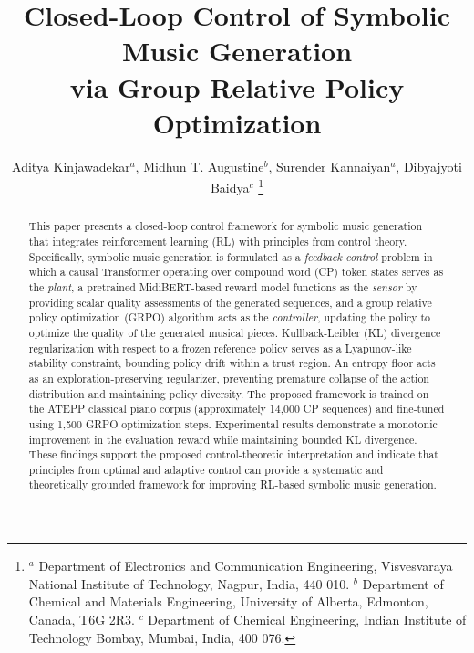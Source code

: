\documentclass[letterpaper, 10 pt, conference]{ieeeconf}
\begin{document}
\title{\LARGE \bf Closed-Loop Control of Symbolic Music Generation\\via Group Relative Policy Optimization}










\author{Aditya Kinjawadekar$^{a}$, Midhun T. Augustine$^{b}$,  
Surender Kannaiyan$^{a}$, Dibyajyoti Baidya$^{c}$  
\thanks{$^a$ Department of Electronics and Communication Engineering,   Visvesvaraya National Institute of Technology,  Nagpur, India, 440 010. \newline
$^b$ Department of Chemical and Materials Engineering, University of Alberta, Edmonton, Canada, T6G 2R3. \newline
$^c$ Department of Chemical  Engineering, Indian Institute of Technology Bombay, Mumbai, India, 400 076.
}}

\maketitle

\begin{abstract}
This paper presents a closed-loop control framework for symbolic music generation that integrates reinforcement learning (RL) with principles from control theory. Specifically, symbolic music generation is formulated as a \emph{feedback control} problem in which a causal Transformer operating over compound word (CP) token states serves as the \emph{plant}, a pretrained MidiBERT-based reward model functions as the \emph{sensor} by providing scalar quality assessments of the generated sequences, and a group relative policy optimization (GRPO) algorithm acts as the \emph{controller}, updating the policy to optimize the quality of the generated musical pieces.
Kullback-Leibler (KL) divergence regularization with respect to a frozen reference policy serves as a Lyapunov-like stability constraint, bounding policy drift within a trust region. An entropy floor acts as an exploration-preserving regularizer, preventing premature collapse of the action distribution and maintaining policy diversity. The proposed framework is trained on the ATEPP classical piano corpus (approximately 14,000 CP sequences) and fine-tuned using 1,500 GRPO optimization steps. Experimental results demonstrate a monotonic improvement in the evaluation reward while maintaining bounded KL divergence. These findings support the proposed control-theoretic interpretation and indicate that principles from optimal and adaptive control can provide a systematic and theoretically grounded framework for improving RL-based symbolic music generation.
\end{abstract}
\end{document}

